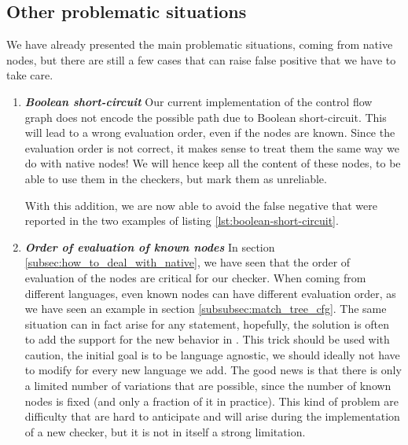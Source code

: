 \subsection{Other problematic situations}
\label{subsec:other_problematic_situation}
	
We have already presented the main problematic situations, coming from native nodes, but there are still a few cases that can raise false positive that we have to take care.

\begin{enumerate}
	\item \textbf{\textit{Boolean short-circuit}} \newline 
	\label{subsubsec:boolean_short_circuit}
	Our current implementation of the control flow graph does not encode the possible path due to Boolean short-circuit. 
	This will lead to a wrong evaluation order, even if the nodes are known. 
	Since the evaluation order is not correct, it makes sense to treat them the same way we do with native nodes! 
	We will hence keep all the content of these nodes, to be able to use them in the checkers, but mark them as unreliable. 


	
	With this addition, we are now able to avoid the false negative that were reported in the two examples of listing \ref{lst:boolean-short-circuit}.
	
	\item \textbf{\textit{Order of evaluation of known nodes}} \newline 
	\label{subsubsec:evaluation_known_nodes}
	In section \ref{subsec:how_to_deal_with_native}, we have seen that the order of evaluation of the nodes are critical for our checker.
	When coming from different languages, even known nodes can have different evaluation order, as we have seen an example in section \ref{subsubsec:match_tree_cfg}. 
	The same situation can in fact arise for any statement, hopefully, the solution is often to add the support for the new behavior in \slang{}.
	This trick should be used with caution, the initial goal is to be language agnostic, we should ideally not have to modify \slang{} for every new language we add. 
	The good news is that there is only a limited number of variations that are possible, since the number of known nodes is fixed (and only a fraction of it in practice). 
	This kind of problem are difficulty that are hard to anticipate and will arise during the implementation of a new checker, but it is not in itself a strong limitation.
	

\end{enumerate}
